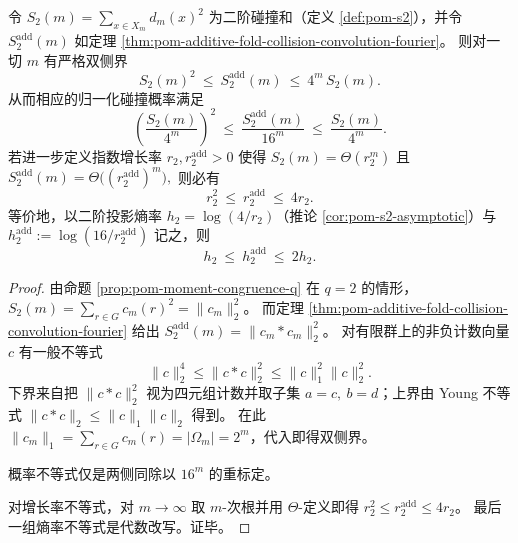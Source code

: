 \begin{proposition}\label{prop:pom-additive-fold-collision-bounds}
令 \(S_2(m)=\sum_{x\in X_m}d_m(x)^2\) 为二阶碰撞和（定义 \ref{def:pom-s2}），并令 \(S_2^{\mathrm{add}}(m)\) 如定理 \ref{thm:pom-additive-fold-collision-convolution-fourier}。
则对一切 \(m\) 有严格双侧界
\[
\boxed{\;
S_2(m)^2\ \le\ S_2^{\mathrm{add}}(m)\ \le\ 4^m\,S_2(m).\;}
\]
从而相应的归一化碰撞概率满足
\[
\left(\frac{S_2(m)}{4^m}\right)^2
\ \le\
\frac{S_2^{\mathrm{add}}(m)}{16^m}
\ \le\
\frac{S_2(m)}{4^m}.
\]
若进一步定义指数增长率 \(r_2,r_2^{\mathrm{add}}>0\) 使得
\(
S_2(m)=\Theta(r_2^m)
\)
且
\(
S_2^{\mathrm{add}}(m)=\Theta\big((r_2^{\mathrm{add}})^m\big),
\)
则必有
\[
\boxed{\;
r_2^2\ \le\ r_2^{\mathrm{add}}\ \le\ 4r_2.\;}
\]
等价地，以二阶投影熵率 \(h_2=\log(4/r_2)\)（推论 \ref{cor:pom-s2-asymptotic}）与
\(
h_2^{\mathrm{add}}:=\log(16/r_2^{\mathrm{add}})
\)
记之，则
\[
h_2\ \le\ h_2^{\mathrm{add}}\ \le\ 2h_2.
\]
\end{proposition}
\begin{proof}
由命题 \ref{prop:pom-moment-congruence-q} 在 \(q=2\) 的情形，\(S_2(m)=\sum_{r\in G}c_m(r)^2=\|c_m\|_2^2\)。
而定理 \ref{thm:pom-additive-fold-collision-convolution-fourier} 给出 \(S_2^{\mathrm{add}}(m)=\|c_m*c_m\|_2^2\)。
对有限群上的非负计数向量 \(c\) 有一般不等式
\[
\|c\|_2^4\le \|c*c\|_2^2\le \|c\|_1^2\|c\|_2^2.
\]
下界来自把 \(\|c*c\|_2^2\) 视为四元组计数并取子集 \(a=c,\ b=d\)；上界由 Young 不等式 \(\|c*c\|_2\le \|c\|_1\|c\|_2\) 得到。
在此 \(\|c_m\|_1=\sum_{r\in G}c_m(r)=|\Omega_m|=2^m\)，代入即得双侧界。
\par
概率不等式仅是两侧同除以 \(16^m\) 的重标定。
\par
对增长率不等式，对 \(m\to\infty\) 取 \(m\)-次根并用 \(\Theta\)-定义即得 \(r_2^2\le r_2^{\mathrm{add}}\le 4r_2\)。
最后一组熵率不等式是代数改写。证毕。
\end{proof}
